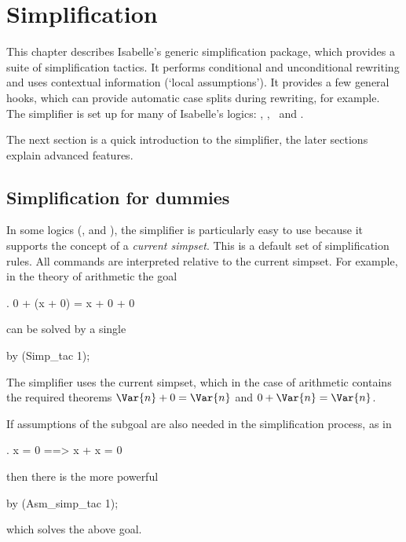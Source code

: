 \chapter{Simplification} \label{simp-chap}

This chapter describes Isabelle's generic simplification package, which
provides a suite of simplification tactics.  It performs conditional and
unconditional rewriting and uses contextual information (`local
assumptions').  It provides a few general hooks, which can provide
automatic case splits during rewriting, for example.  The simplifier is set
up for many of Isabelle's logics: \FOL, \ZF, \HOL\ and \HOLCF.

The next section is a quick introduction to the simplifier, the later
sections explain advanced features.

\section{Simplification for dummies}
\label{sec:simp-for-dummies}

In some logics (\FOL, {\HOL} and \ZF), the simplifier is particularly easy to
use because it supports the concept of a {\em current
  simpset}.  This is a default set of simplification
rules.  All commands are interpreted relative to the current simpset.  For
example, in the theory of arithmetic the goal
\begin{ttbox}
{. 0 + (x + 0) = x + 0 + 0}
\end{ttbox}
can be solved by a single
\begin{ttbox}
by (Simp_tac 1);
\end{ttbox}
The simplifier uses the current simpset, which in the case of arithmetic
contains the required theorems $\Var{n}+0 = \Var{n}$ and $0+\Var{n} =
\Var{n}$.

If assumptions of the subgoal are also needed in the simplification
process, as in
\begin{ttbox}
{. x = 0 ==> x + x = 0}
\end{ttbox}
then there is the more powerful
\begin{ttbox}
by (Asm_simp_tac 1);
\end{ttbox}
which solves the above goal.

